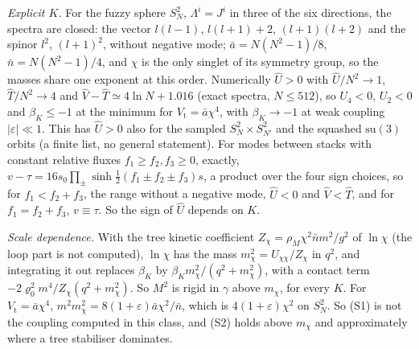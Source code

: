 \emph{Explicit \(K\).} For the fuzzy sphere \(S^2_N\), \(\Lambda^i=J^i\) in three of the six directions, the spectra are closed: the vector \(l(l-1)\), \(l(l+1)+2\), \((l+1)(l+2)\) and the spinor \(l^2\), \((l+1)^2\), without negative mode; \(\bar a=N(N^2-1)/8\), \(\bar n=N(N^2-1)/4\), and \(\chi\) is the only singlet of its symmetry group, so the masses share one exponent at this order. Numerically \(\hat U>0\) with \(\hat U/N^2\to1\), \(\hat T/N^2\to4\) and \(\hat V-\hat T\simeq4\ln N+1.016\) (exact spectra, \(N\le512\)), so \(U_4<0\), \(U_2<0\) and \(\beta_K\le-1\) at the minimum for \(V_{\mathrm t}=\bar a\chi^4\), with \(\beta_K\to-1\) at weak coupling \(|\varepsilon|\ll1\). This has \(\hat U>0\) also for the sampled \(S^2_N\times S^2_{N'}\) and the squashed \(\mathrm{su}(3)\) orbits (a finite list, no general statement). For modes between stacks with constant relative fluxes \(f_1\ge f_2,f_3\ge0\), exactly, \(v-\tau=16s_0\prod_\pm\sinh\tfrac12(f_1\pm f_2\pm f_3)s\), a product over the four sign choices, so for \(f_1<f_2+f_3\), the range without a negative mode, \(\hat U<0\) and \(\hat V<\hat T\), and for \(f_1=f_2+f_3\), \(v\equiv\tau\). So the sign of \(\hat U\) depends on \(K\).

\emph{Scale dependence.} With the tree kinetic coefficient \(Z_\chi=\rho_M\chi^2\bar nm^2/g^2\) of \(\ln\chi\) (the loop part is not computed), \(\ln\chi\) has the mass \(m_\chi^2=U_{\chi\chi}/Z_\chi\) in \(q^2\), and integrating it out replaces \(\beta_K\) by \(\beta_Km_\chi^2/(q^2+m_\chi^2)\), with a contact term \(-2\varrho_0^2m^4/Z_\chi(q^2+m_\chi^2)\). So \(M^2\) is rigid in \(\gamma\) above \(m_\chi\), for every \(K\). For \(V_{\mathrm t}=\bar a\chi^4\), \(m^2m_\chi^2=8(1+\varepsilon)\bar a\chi^2/\bar n\), which is \(4(1+\varepsilon)\chi^2\) on \(S^2_N\). So (S1) is not the coupling computed in this class, and (S2) holds above \(m_\chi\) and approximately where a tree stabiliser dominates.

